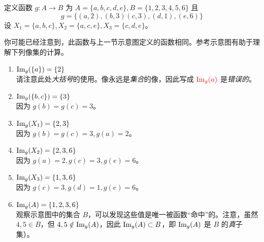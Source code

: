 \begin{example}\label{ex:example7.3.2}
    定义函数 $g : A \to B$ 为 $A = \{a, b, c, d, e\}, B = \{1, 2, 3, 4, 5, 6\}$ 且
    \[g = \{(a, 2),(b, 3)(c, 3),(d, 1),(e, 6)\}\]
    设 $X_1 = \{a, b, c\}, X_2 = \{a, c, e\}, X_3 = \{c, d, e\}$。

    你可能已经注意到，此函数与上一节示意图定义的函数相同。参考示意图有助于理解下列像集的计算。

    \begin{center}
        {}
    \end{center}

    \begin{enumerate}[label=(\arabic*)]
        \item $\text{Im}_g(\{a\}) = \{2\}$ \\
            请注意此处\emph{大括号}的使用。像永远是\emph{集合}的像，因此写成 $\textcolor{red}{\text{Im}_g(a)}$ 是\emph{错误的}。
        \item $\text{Im}_g(\{b, c\}) = \{3\}$ \\
            因为 $g(b) = g(c) = 3$。
        \item $\text{Im}_g(X_1) = \{2, 3\}$ \\
            因为 $g(b) = g(c) = 3, g(a) = 2$。
        \item $\text{Im}_g(X_2) = \{2, 3, 6\}$ \\
            因为 $g(a) = 2, g(c) = 3, g(e) = 6$。
        \item $\text{Im}_g(X_3) = \{1, 3, 6\}$ \\
            因为 $g(c) = 3, g(d) = 1, g(e) = 6$。
        \item $\text{Im}_g(A) = \{1, 2, 3, 6\}$ \\
            观察示意图中的集合 $B$，可以发现这些值是唯一被函数``命中''的。注意，虽然 $4,5 \in B$，但 $4,5 \notin \text{Im}_g(A)$，因此 $\text{Im}_g(A) \subset B$，即 $\text{Im}_g(A)$ 是 $B$ 的\emph{真}子集）。
    \end{enumerate}
\end{example}

